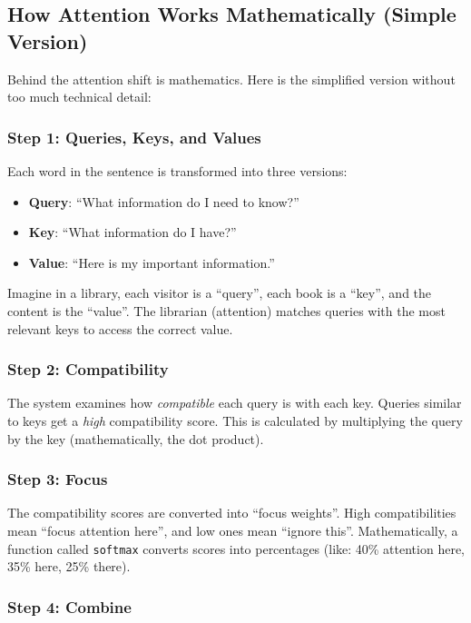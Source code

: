 \subsection{How Attention Works Mathematically (Simple Version)}

Behind the attention shift is mathematics. Here is the simplified version without too much technical detail:

\subsubsection{Step 1: Queries, Keys, and Values}

Each word in the sentence is transformed into three versions:
\begin{itemize}[leftmargin=*]
    \item \textbf{Query}: ``What information do I need to know?''
    \item \textbf{Key}: ``What information do I have?''
    \item \textbf{Value}: ``Here is my important information.''
\end{itemize}

Imagine in a library, each visitor is a ``query'', each book is a ``key'', and the content is the ``value''. The librarian (attention) matches queries with the most relevant keys to access the correct value.

\subsubsection{Step 2: Compatibility}

The system examines how \emph{compatible} each query is with each key. Queries similar to keys get a \emph{high} compatibility score. This is calculated by multiplying the query by the key (mathematically, the dot product).

\subsubsection{Step 3: Focus}

The compatibility scores are converted into ``focus weights''. High compatibilities mean ``focus attention here'', and low ones mean ``ignore this''. Mathematically, a function called \texttt{softmax} converts scores into percentages (like: 40\% attention here, 35\% here, 25\% there).

\subsubsection{Step 4: Combine}

